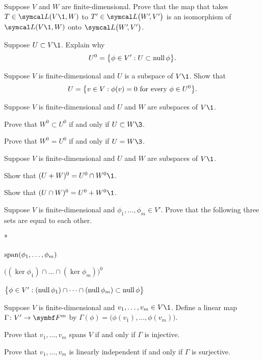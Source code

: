 \begin{exercises}
\exercise
Suppose $V$ and $W$ are finite-dimensional. Prove that the map that takes $T \in \L(V\1,W)$ to $T' \in \L\paren[\big]{W'\!, V'}$ is an isomorphism of $\L(V\1,W)$ onto $\L\paren[\big]{W'\!, V'}$.


\exercise
Suppose $U \subset V\1$. Explain why
\[
U^0 = \br[\big]{\phi \in V': U \subset \ker \phi}.
\]
\exercisedisplayend


\exercise
Suppose $V$ is finite-dimensional and $U$ is a subspace of $V\1$. Show that\label{3Uan}
\[
U = \br[\big]{v \in V: \phi(v) = 0 \text{\ for every\ } \phi \in U^0}.
\]
\exercisedisplayend


\exercise
Suppose $V$ is finite-dimensional and $U$ and $W$ are subspaces of $V\1$.
\begin{subtheorem}
\item
Prove that $W^0 \subset U^0$ if and only if $U \subset W\3$.
\item
Prove that $W^0 = U^0$ if and only if $U = W\3$.
\end{subtheorem}
\exercisesubtheoremend


\exercise
Suppose $V$ is finite-dimensional and $U$ and $W$ are subspaces of $V\1$.\label{2222}
\begin{subtheorem}
\item
Show that $(U + W)^0 = U^0 \cap W^0\1$.
\item
Show that $(U \cap W)^0 = U^0 + W^0\1$.
\end{subtheorem}
\exercisesubtheoremend


\exercise
Suppose $V$ is finite-dimensional and $\phi_1, \ldots, \phi_m \in V'\!$. Prove that the following three sets are equal to each other.\label{3intersectnull}
\begin{subtheorem}*
\item
$\Span(\phi_1, \dots, \phi_m)$
\item
$\bigl( (\ker \phi_1) \cap \dots \cap (\ker \phi_m)\bigr)^0$
\item
$\br[\big]{ \phi \in V': (\ker \phi_1) \cap \dots \cap (\ker \phi_m) \subset \ker \phi }$
\end{subtheorem}
\exercisesubtheoremend


\exercise
Suppose $V$ is finite-dimensional and $v_1, \dots, v_m \in V\1$. Define a linear map $\Gamma \colon V' \to \F{m}$ by
$
\Gamma(\phi) = \bigl(\phi(v_1), \dots, \phi(v_m) \bigr)$.
\begin{subtheorem}
\item
Prove that $v_1, \dots, v_m$ spans $V$ if and only if $\Gamma$ is injective.
\item
Prove that $v_1, \dots, v_m$ is linearly independent if and only if $\Gamma$ is surjective.
\end{subtheorem}
\exercisesubtheoremend



\end{exercises}

